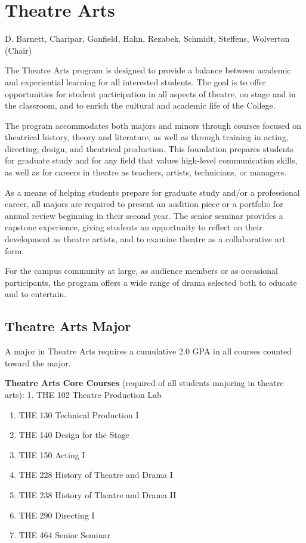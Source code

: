 \documentclass[
  letterpaper,
]{scrbook}
\begin{document}
\hypertarget{theatre-arts}{%
\section{Theatre Arts}\label{theatre-arts}}

D. Barnett, Charipar, Ganfield, Hahn, Rezabek, Schmidt, Steffens,
Wolverton (Chair)

The Theatre Arts program is designed to provide a balance between
academic and experiential learning for all interested students. The goal
is to offer opportunities for student participation in all aspects of
theatre, on stage and in the classroom, and to enrich the cultural and
academic life of the College.

The program accommodates both majors and minors through courses focused
on theatrical history, theory and literature, as well as through
training in acting, directing, design, and theatrical production. This
foundation prepares students for graduate study and for any field that
values high-level communication skills, as well as for careers in
theatre as teachers, artists, technicians, or managers.

As a means of helping students prepare for graduate study and/or a
professional career, all majors are required to present an audition
piece or a portfolio for annual review beginning in their second year.
The senior seminar provides a capstone experience, giving students an
opportunity to reflect on their development as theatre artists, and to
examine theatre as a collaborative art form.

For the campus community at large, as audience members or as occasional
participants, the program offers a wide range of drama selected both to
educate and to entertain.

\hypertarget{sec-theatre-arts-major}{%
\subsection{Theatre Arts Major}\label{sec-theatre-arts-major}}

A major in Theatre Arts requires a cumulative 2.0 GPA in all courses
counted toward the major.

\textbf{Theatre Arts Core Courses} (required of all students majoring in
theatre arts): 1. THE 102 Theatre Production Lab

\begin{enumerate}
\def\labelenumi{\arabic{enumi}.}
\setcounter{enumi}{1}
\item
  THE 130 Technical Production I
\item
  THE 140 Design for the Stage
\item
  THE 150 Acting I
\item
  THE 228 History of Theatre and Drama I
\item
  THE 238 History of Theatre and Drama II
\item
  THE 290 Directing I
\item
  THE 464 Senior Seminar
\end{enumerate}
\end{document}
